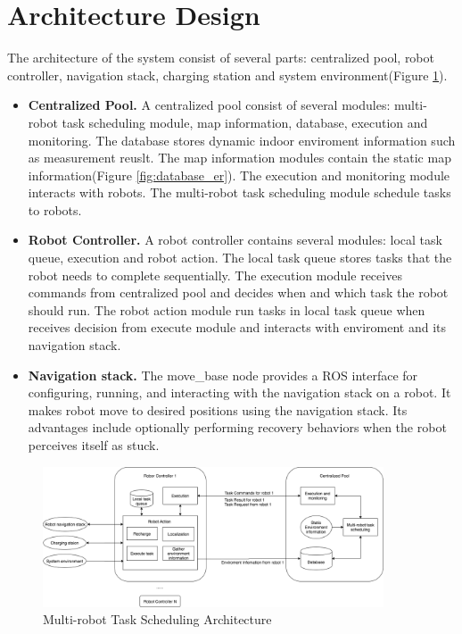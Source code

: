\section{Architecture Design}

The architecture of the system consist of several parts: centralized pool, robot controller, navigation stack, charging station and system environment(Figure \ref{fig:system_architecture}). 

\begin{itemize}
	\item \textbf{Centralized Pool.} A centralized pool consist of several modules: multi-robot task scheduling module, map information, database, execution and monitoring. The database stores dynamic indoor enviroment information such as measurement reuslt. The map information modules contain the static map information(Figure \ref{fig:database_er}). The execution and monitoring module interacts with robots. The multi-robot task scheduling module schedule tasks to robots.
	\item \textbf{Robot Controller.} A robot controller contains several modules: local task queue, execution and robot action. The local task queue stores tasks that the robot needs to complete sequentially. The execution module receives commands from centralized pool and decides when and which task the robot should run. The robot action module run tasks in local task queue when receives decision from execute module and interacts with enviroment and its navigation stack.
	\item \textbf{Navigation stack.} The move\_base node provides a ROS interface for configuring, running, and interacting with the navigation stack on a robot. It makes robot move to desired positions using the navigation stack. Its advantages include optionally performing recovery behaviors when the robot perceives itself as stuck\cite{MOVEBASE}. 
\end{itemize} 

\begin{figure}[htbp]
	\centering
	\includegraphics[width = 0.9\textwidth]{content/images/ch3/architecture.drawio.png}
	\caption{Multi-robot Task Scheduling Architecture}
	\label{fig:system_architecture}
\end{figure}

